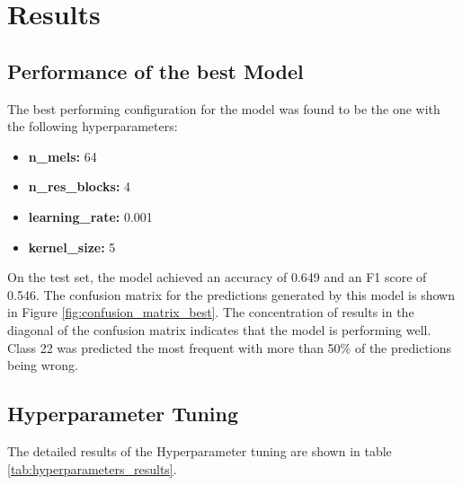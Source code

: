 


\section{Results}
\label{section3}

\subsection{Performance of the best Model}%

The best performing configuration for the model was found to be the one with the following hyperparameters:

\begin{itemize}
    \item \textbf{n\_mels:} 64
    \item \textbf{n\_res\_blocks:} 4
    \item \textbf{learning\_rate:} 0.001
    \item \textbf{kernel\_size:} 5
\end{itemize}

On the test set, the model achieved an accuracy of 0.649 and an F1 score of 0.546. 
The confusion matrix for the predictions generated by this model is shown in Figure \ref{fig:confusion_matrix_best}.
The concentration of results in the diagonal of the confusion matrix indicates that the model is performing well.
Class 22 was predicted the most frequent with more than 50\% of the predictions being wrong.



\subsection{Hyperparameter Tuning}%

The detailed results of the Hyperparameter tuning are shown in table \ref{tab:hyperparameters_results}.










